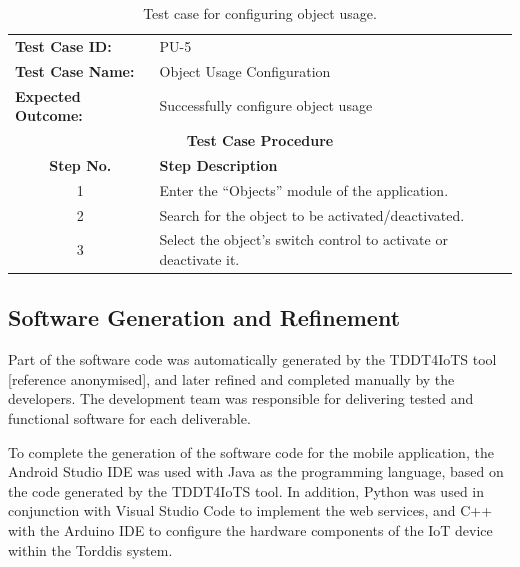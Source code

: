                 \begin{table}[!htbp]
                    \centering
                    \caption{Test case for configuring object usage.}
                    \label{tab:configure-object-usage-test-case}
                    \begin{tabularx}{\textwidth}{l X}
                        \toprule
                        \textbf{Test Case ID:} & PU-5 \\
                        \textbf{Test Case Name:} & Object Usage Configuration \\
                        \textbf{Expected Outcome:} & Successfully configure object usage \\
                        \midrule
                        \multicolumn{2}{c}{\textbf{Test Case Procedure}} \\
                        \midrule
                        \multicolumn{1}{c}{\textbf{Step No.}} & \textbf{Step Description} \\
                        \midrule
                        \multicolumn{1}{c}{1} & Enter the ``Objects'' module of the application. \\
                        \multicolumn{1}{c}{2} & Search for the object to be activated/deactivated. \\
                        \multicolumn{1}{c}{3} & Select the object’s switch control to activate or deactivate it. \\
                        \bottomrule
                    \end{tabularx}
                \end{table}
                
                \subsection{Software Generation and Refinement}
                Part of the software code was automatically generated by the TDDT4IoTS tool [reference anonymised], and later refined and completed manually by the developers. The development team was responsible for delivering tested and functional software for each deliverable.
                
                To complete the generation of the software code for the mobile application, the Android Studio IDE \cite{Android2024Android} was used with Java as the programming language, based on the code generated by the TDDT4IoTS tool. In addition, Python was used in conjunction with Visual Studio Code \citep{Microsoft2024Visual} to implement the web services, and C++ with the Arduino IDE \citep{Arduino2024Software} to configure the hardware components of the IoT device within the Torddis system.
                
